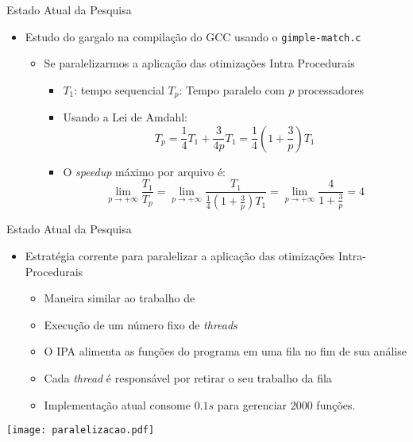 \begin{frame}{Estado Atual da Pesquisa}
    \begin{itemize}
        \item Estudo do gargalo na compilação do GCC usando o \texttt{gimple-match.c}
            \begin{itemize}
                \item Se paralelizarmos a aplicação das otimizações Intra Procedurais
            \begin{itemize}
                \item $T_1$: tempo sequencial \hfil\hfil $T_p$: Tempo paralelo com $p$ processadores
                \item Usando a Lei de Amdahl:
$$ T_p = \frac{1}{4} T_1 + \frac{3}{4p}T_1 = \frac{1}{4} \left( 1 + \frac{3}{p}
\right)T_1 $$ 
                \item O \textit{speedup} máximo por arquivo é: $$
\lim_{p \rightarrow +\infty} \frac{T_1}{T_p} = \lim_{p \rightarrow +\infty}
\frac{T_1}{\frac{1}{4} \left( 1 + \frac{3}{p} \right)T_1} = \lim_{p \rightarrow
+\infty} \frac{4}{1 + \frac{3}{p}} = 4$$
            \end{itemize}
            \end{itemize}
    \end{itemize}
\end{frame}


\begin{frame}{Estado Atual da Pesquisa}
    \begin{itemize}
        \item Estratégia corrente para paralelizar a aplicação das otimizações Intra-Procedurais
            \begin{itemize}
                \item Maneira similar ao trabalho de \cite{wortman1992}
                \item Execução de um número fixo de \textit{threads}
                \item O IPA alimenta as funções do programa em uma fila no fim de sua análise
                \item Cada \textit{thread} é responsável por retirar o seu trabalho da fila
                \item Implementação atual consome $0.1s$ para gerenciar $2000$ funções.
    \end{itemize}
\end{itemize}

 \centering
 \texttt{[image: paralelizacao.pdf]}
\end{frame}

